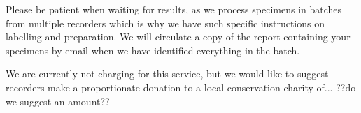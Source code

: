 \documentclass[10pt]{article}
\begin{document}
Please be patient when waiting for results, as we process specimens in batches from multiple recorders which is why we have such specific instructions on labelling and preparation. We will circulate a copy of the report containing your specimens by email when we have identified everything in the batch.

We are currently not charging for this service, but we would like to suggest recorders make a proportionate donation to a local conservation charity of... ??do we suggest an amount??

\end{document}
